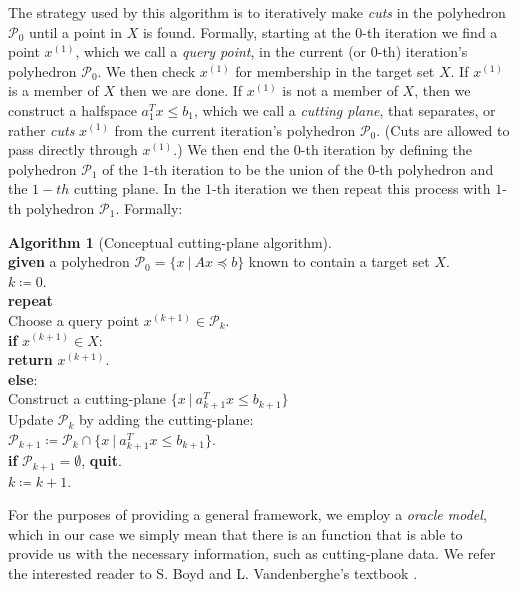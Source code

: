 \documentclass[11pt]{amsart}
\theoremstyle{definition}
\newtheorem{algorithm}{Algorithm}
\theoremstyle{remark}
\newcommand{\ind}{\hspace*{0.5cm}}
\newcommand{\transpose}{T}
\begin{document}
        The strategy used by this algorithm is to iteratively make \emph{cuts} in the polyhedron $\mathcal{P}_0$ until a point in $X$ is found. Formally, starting at the $0$-th iteration we find a point $x^{(1)}$, which we call a \emph{query point}, in the current (or $0$-th) iteration's polyhedron $\mathcal{P}_0$. We then check $x^{(1)}$ for membership in the target set $X$. If $x^{(1)}$ is a member of $X$ then we are done. If $x^{(1)}$ is not a member of $X$, then we construct a halfspace $a_{1}^\transpose x \leq b_{1}$, which we call a \emph{cutting plane}, that separates, or rather \emph{cuts} $x^{(1)}$ from the current iteration's polyhedron $\mathcal{P}_0$. (Cuts are allowed to pass directly through $x^{(1)}$.) We then end the $0$-th iteration by defining the polyhedron $\mathcal{P}_1$ of the $1$-th iteration to be the union of the $0$-th polyhedron and the $1-th$ cutting plane. In the $1$-th iteration we then repeat this process with $1$-th polyhedron $\mathcal{P}_1$. Formally:
        \begin{algorithm}[Conceptual cutting-plane algorithm]
        \label{a:general_cp_alg}\mbox{}\\
            \ind \textbf{given} a polyhedron $\mathcal{P}_0 = \{x \:|\: Ax \preceq b\}$ known to contain a target set $X$. \\
            \ind $k \coloneqq 0$. \\
            \ind \textbf{repeat} \\
            \ind\ind Choose a query point $x^{(k+1)} \in \mathcal{P}_k$. \\
            \ind\ind \textbf{if} $x^{(k+1)} \in X$: \\
            \ind\ind\ind\textbf{return} $x^{(k+1)}$. \\
            \ind\ind \textbf{else}: \\
            \ind\ind\ind Construct a cutting-plane $\{x \:|\: a_{k+1}^\transpose x \leq b_{k+1} \}$ \\
            \ind\ind\ind Update $\mathcal{P}_k$ by adding the cutting-plane: \\ 
            \ind\ind\ind $\mathcal{P}_{k+1} \coloneqq \mathcal{P}_k \cap \{x \:|\: a_{k+1}^\transpose x \leq b_{k+1} \}$. \\
            \ind\ind \textbf{if} $\mathcal{P}_{k+1} = \emptyset$, \textbf{quit}. \\
            \ind\ind $k \coloneqq k+1$.
        \end{algorithm}

        For the purposes of providing a general framework, we employ a \emph{oracle model}, which in our case we simply mean that there is an function that is able to provide us with the necessary information, such as cutting-plane data. We refer the interested reader to S. Boyd and L. Vandenberghe's textbook \cite[Section 4.1.4]{BV04}.
\end{document}

